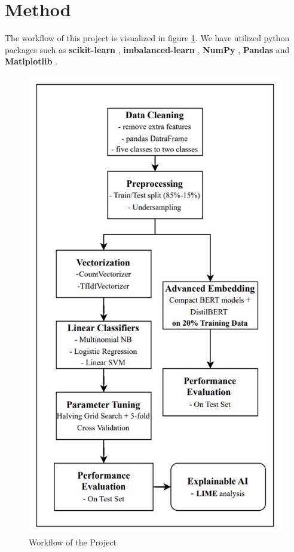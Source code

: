 \documentclass[11pt]{article}
\begin{document}
 
 \section{Method} 
 The workflow of this project is visualized in figure \ref{fig:workflow}. We have utilized python packages such as \textbf{scikit-learn} \cite{scikit-learn}, \textbf{imbalanced-learn} \cite{imblearn}, \textbf{NumPy} \cite{numpy}, \textbf{Pandas} \cite{pandas} \cite{pandassoft} and \textbf{Matlplotlib} \cite{matplotlib}.
 \begin{figure}
     \centering
     \includegraphics[scale=0.5]{figures/TM-workflow.png}
     \caption{Workflow of the Project}
     \label{fig:workflow}
 \end{figure}
\end{document}
